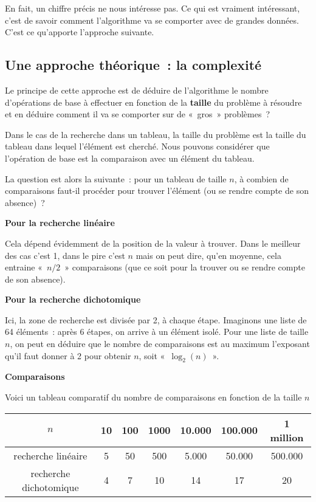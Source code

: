 			En fait, un chiffre précis ne nous intéresse pas.  Ce qui est
			vraiment intéressant, c’est de savoir comment l’algorithme va se
			comporter avec de grandes données.  C’est ce qu’apporte l’approche
			suivante.
		
		\subsection{Une approche théorique~: la complexité}
		
			Le principe de cette approche est de déduire de l'algorithme le
			nombre d’opérations de base à effectuer en fonction de la
			\textbf{taille} du problème à résoudre et en déduire comment il va
			se comporter sur de «~gros~» problèmes~?
		
			Dans le cas de la recherche dans un tableau, la taille du problème
			est la taille du tableau dans lequel l'élément est cherché.  Nous
			pouvons considérer que l’opération de base est la comparaison avec
			un élément du tableau. 
			
			La question est alors la suivante~: pour un tableau de taille $n$,
			à combien de comparaisons faut-il procéder pour trouver l’élément
			(ou se rendre compte de son absence)~?
		
			{\bfseries
			Pour la recherche linéaire}
		
				Cela dépend évidemment de la position de la valeur à trouver. 
				Dans le meilleur des cas c’est 1, 
				dans le pire c’est $n$ mais on peut dire, 
				qu’en moyenne, 
				cela entraine «~$n/2$~» comparaisons 
				(que ce soit pour la trouver ou se rendre compte de son absence).
		
			{\bfseries
			Pour la recherche dichotomique}
		
				Ici, la zone de recherche est divisée par 2, à chaque étape. 
				Imaginons une liste de 64 éléments~: 
				après 6 étapes, on arrive à un élément isolé. 
				Pour une liste de taille $n$, 
				on peut en déduire que le nombre de comparaisons 
				est au maximum l’exposant qu’il faut donner à 2 pour obtenir $n$, 
				soit «~$\log_2(n)$~».
		
			{\sffamily\bfseries\upshape
			Comparaisons}
		
			Voici un tableau comparatif du nombre de comparaisons en fonction de
			la taille $n$
		
			\begin{center}
				\small
				\begin{tabular}{|c|c|c|c|c|c|c|}
			\hline
			\rowcolor{black!40}
			$n$ & 10 & 100 & 1000 & 10.000 & 100.000 & 1 million \\
			\hline
			recherche linéaire & 5 & 50 & 500 & 5.000 & 50.000 & 500.000 \\
			\hline
			recherche dichotomique & 4 & 7 & 10 & 14 & 17 & 20 \\
			\hline
			\end{tabular}
			\end{center}
			
